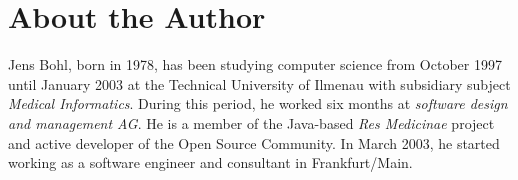 
\section{About the Author}
    Jens Bohl, born in 1978, has been studying computer science from October 1997 until January
    2003 at the Technical University of Ilmenau with subsidiary
    subject \emph{Medical Informatics}. During this period, he worked six months at \emph{software design
    and management AG}. He is a member of the Java-based \emph{Res Medicinae}
    project and active developer of the Open Source Community. In March 2003, he started
    working as a software engineer and consultant in Frankfurt/Main.
